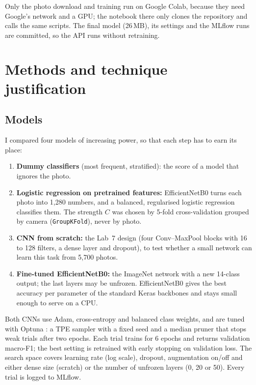 \documentclass[11pt,a4paper]{article}
\begin{document}
Only the photo download and training run on Google Colab, because they need Google's network and a
GPU; the notebook there only clones the repository and calls the same scripts. The final model
(26\,MB), its settings and the MLflow runs are committed, so the API runs without retraining.

\section{Methods and technique justification}

\subsection{Models}
I compared four models of increasing power, so that each step has to earn its place:
\begin{enumerate}
\item \textbf{Dummy classifiers} (most frequent, stratified): the score of a model that ignores the photo.
\item \textbf{Logistic regression on pretrained features:} EfficientNetB0 \cite{tan2019} turns each photo
      into 1,280 numbers, and a balanced, regularised logistic regression classifies them. The strength
      $C$ was chosen by 5-fold cross-validation grouped by camera (\texttt{GroupKFold}), never by photo.
\item \textbf{CNN from scratch:} the Lab~7 design (four Conv--MaxPool blocks with 16 to 128 filters,
      a dense layer and dropout), to test whether a small network can learn this task from 5,700 photos.
\item \textbf{Fine-tuned EfficientNetB0:} the ImageNet network with a new 14-class output; the last layers
      may be unfrozen. EfficientNetB0 gives the best accuracy per parameter of the standard Keras
      backbones and stays small enough to serve on a CPU.
\end{enumerate}
Both CNNs use Adam, cross-entropy and balanced class weights, and are tuned with Optuna \cite{akiba2019}:
a TPE sampler with a fixed seed and a median pruner that stops weak trials after two epochs. Each trial
trains for 6 epochs and returns validation macro-F1; the best setting is retrained with early stopping on
validation loss. The search space covers learning rate (log scale), dropout, augmentation on/off and either
dense size (scratch) or the number of unfrozen layers (0, 20 or 50). Every trial is logged to MLflow.
\end{document}
